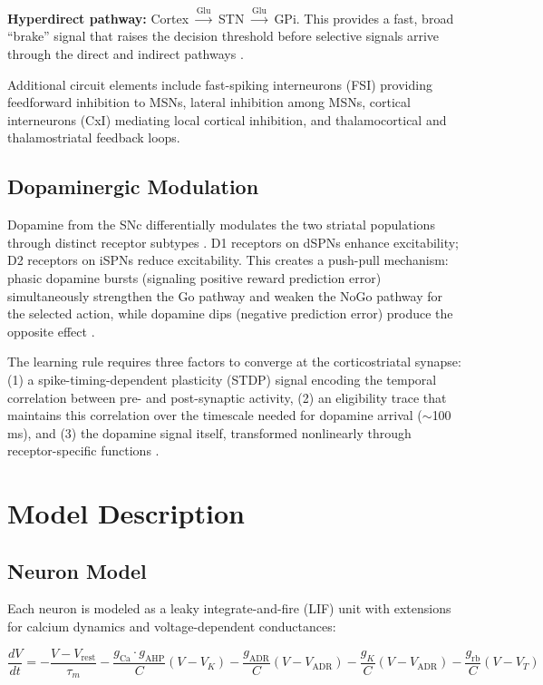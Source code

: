 \documentclass[11pt,a4paper]{article}
\begin{document}
\textbf{Hyperdirect pathway:} Cortex $\xrightarrow{\text{Glu}}$ STN $\xrightarrow{\text{Glu}}$ GPi. This provides a fast, broad ``brake'' signal that raises the decision threshold before selective signals arrive through the direct and indirect pathways \citep{nambu2002}.

Additional circuit elements include fast-spiking interneurons (FSI) providing feedforward inhibition to MSNs, lateral inhibition among MSNs, cortical interneurons (CxI) mediating local cortical inhibition, and thalamocortical and thalamostriatal feedback loops.

\subsection{Dopaminergic Modulation}

Dopamine from the SNc differentially modulates the two striatal populations through distinct receptor subtypes \citep{gerfen2011}. D1 receptors on dSPNs enhance excitability; D2 receptors on iSPNs reduce excitability. This creates a push-pull mechanism: phasic dopamine bursts (signaling positive reward prediction error) simultaneously strengthen the Go pathway and weaken the NoGo pathway for the selected action, while dopamine dips (negative prediction error) produce the opposite effect \citep{frank2004}.

The learning rule requires three factors to converge at the corticostriatal synapse: (1) a spike-timing-dependent plasticity (STDP) signal encoding the temporal correlation between pre- and post-synaptic activity, (2) an eligibility trace that maintains this correlation over the timescale needed for dopamine arrival ($\sim$100 ms), and (3) the dopamine signal itself, transformed nonlinearly through receptor-specific functions \citep{izhikevich2007,yagishita2014}.

\section{Model Description}

\subsection{Neuron Model}

Each neuron is modeled as a leaky integrate-and-fire (LIF) unit with extensions for calcium dynamics and voltage-dependent conductances:

\begin{equation}
\frac{dV}{dt} = -\frac{V - V_{\text{rest}}}{\tau_m} - \frac{g_{\text{Ca}} \cdot g_{\text{AHP}}}{C}(V - V_K) - \frac{g_{\text{ADR}}}{C}(V - V_{\text{ADR}}) - \frac{g_K}{C}(V - V_{\text{ADR}}) - \frac{g_{\text{rb}}}{C}(V - V_T)
\end{equation}
\end{document}
